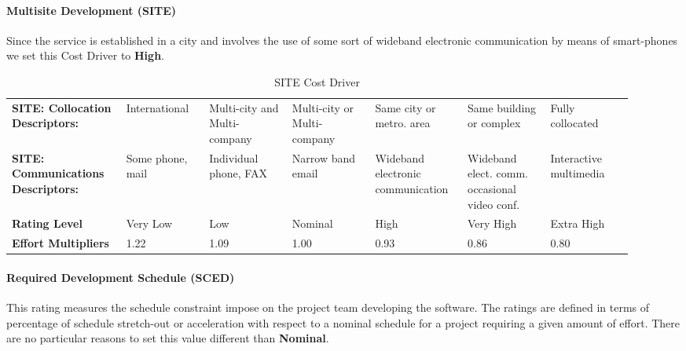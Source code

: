 \paragraph{Multisite Development (SITE)} Since the service is established in a city and involves the use of some sort of wideband electronic communication by means of smart-phones we set this Cost Driver to \textbf{High}.

\begin{table}[H]
	\centering
	\begin{tabular}{|M{0.165\linewidth}|M{0.125\linewidth}|M{0.125\linewidth}|M{0.125\linewidth}|M{0.125\linewidth}|M{0.125\linewidth}|M{0.125\linewidth}|}
		\hline
		\textbf{SITE: Collocation \break Descriptors:} & {\small International} & {\small Multi-city and Multi-company} & {\small Multi-city or Multi-company} & {\small Same city or metro. area} & {\small Same building or complex} & {\small Fully collocated} \\
		\textbf{SITE: Communications \break Descriptors:} & {\small Some phone, mail} & {\small Individual phone, FAX} & {\small Narrow band email} & {\small Wideband electronic communication} & {\small Wideband elect. comm. occasional video conf.} & {\small Interactive multimedia} \\
		\hline
		\textbf{Rating Level} & Very Low & Low & Nominal & High & Very High & Extra High \\
		\hline
		\textbf{Effort Multipliers} & 1.22 & 1.09 & 1.00 & 0.93 & 0.86 & 0.80 \\
		\hline
	\end{tabular}
	\caption{SITE Cost Driver}
\end{table}

\paragraph{Required Development Schedule (SCED)}
This rating measures the schedule constraint impose on the project team developing the software. The ratings are defined in terms of percentage of schedule stretch-out or acceleration with respect to a nominal schedule for a project requiring a given amount of effort. There are no particular reasons to set this value different than \textbf{Nominal}.

